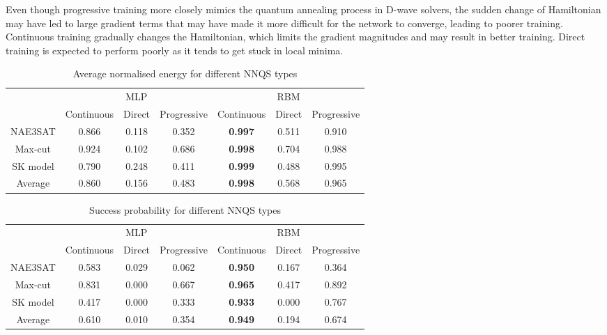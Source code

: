 Even though progressive training more closely mimics the quantum annealing process in D-wave solvers, the sudden change of Hamiltonian may have led to large gradient terms that may have made it more difficult for the network to converge, leading to poorer training. Continuous training gradually changes the Hamiltonian, which limits the gradient magnitudes and may result in better training. Direct training is expected to perform poorly as it tends to get stuck in local minima.


\begin{table}[!htb]
    \centering
    \begin{tabular}{ccccccc} \toprule
        ~ & \multicolumn{3}{c}{MLP} & \multicolumn{3}{c}{RBM} \\
        \cmidrule{2-7} & Continuous & Direct & Progressive & Continuous & Direct & Progressive \\
        \midrule
        NAE3SAT & 0.866 & 0.118 & 0.352 & \textbf{0.997} & 0.511 & 0.910 \\
        Max-cut & 0.924 & 0.102 & 0.686 & \textbf{0.998} & 0.704 & 0.988 \\
        SK model & 0.790 & 0.248 & 0.411 & \textbf{0.999} & 0.488 & 0.995 \\ \midrule
        Average & 0.860 & 0.156 & 0.483 & \textbf{0.998} & 0.568 & 0.965 \\ \bottomrule
    \end{tabular}
    \caption{Average normalised energy for different NNQS types}
    \label{results:nnqsnormalizedenergy}
\end{table}

\begin{table}[!htb]
    \centering
    \begin{tabular}{ccccccc} \toprule
        ~ & \multicolumn{3}{c}{MLP} & \multicolumn{3}{c}{RBM} \\
        \cmidrule{2-7} & Continuous & Direct & Progressive & Continuous & Direct & Progressive \\
        \midrule
        NAE3SAT & 0.583 & 0.029 & 0.062 & \textbf{0.950} & 0.167 & 0.364 \\
        Max-cut & 0.831 & 0.000 & 0.667 & \textbf{0.965} & 0.417 & 0.892 \\
        SK model & 0.417 & 0.000 & 0.333 & \textbf{0.933} & 0.000 & 0.767 \\ \midrule
        Average & 0.610 & 0.010 & 0.354 & \textbf{0.949} & 0.194 & 0.674 \\ \bottomrule
    \end{tabular}
    \caption{Success probability for different NNQS types}
    \label{results:nnqssuccess}
\end{table}